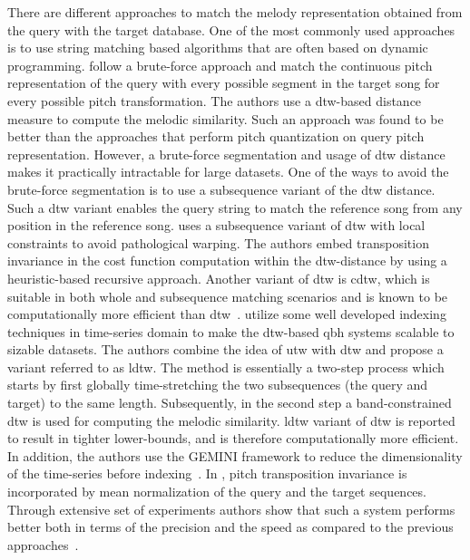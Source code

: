 There are different approaches to match the melody representation obtained from the query with the target database. One of the most commonly used approaches is to use string matching based algorithms that are often based on dynamic programming. \cite{mazzoni2001melody} follow a brute-force approach and match the continuous pitch representation of the query with every possible segment in the target song for every possible pitch transformation. The authors use a \gls{dtw}-based distance measure to compute the melodic similarity. Such an approach was found to be better than the approaches that perform pitch quantization on query pitch representation. However, a brute-force segmentation and usage of \gls{dtw} distance makes it practically intractable for large datasets. One of the ways to avoid the brute-force segmentation is to use a subsequence variant of the \gls{dtw} distance. Such a \gls{dtw} variant enables the query string to match the reference song from any position in the reference song. \cite{jang2000query} uses a subsequence variant of \gls{dtw} with local constraints to avoid pathological warping. The authors embed transposition invariance in the cost function computation within the \gls{dtw}-distance by using a heuristic-based recursive approach. Another variant of \gls{dtw} is \gls{cdtw}, which is suitable in both whole and subsequence matching scenarios and is known to be computationally more efficient than \gls{dtw}~\cite{lijffijt2010benchmarking}. \cite{zhu2003query} utilize some well developed indexing techniques in time-series domain to make the \gls{dtw}-based \gls{qbh} systems scalable to sizable datasets. The authors combine the idea of \gls{utw} with \gls{dtw} and propose a variant referred to as \gls{ldtw}. The method is essentially a two-step process which starts by first globally time-stretching the two subsequences (the query and target) to the same length. Subsequently, in the second step a band-constrained \gls{dtw} is used for computing the melodic similarity. \gls{ldtw} variant of \gls{dtw} is reported to result in tighter lower-bounds, and is therefore computationally more efficient. In addition, the authors use the GEMINI framework to reduce the dimensionality of the time-series before indexing~\cite{keogh2001dimensionality}. In \cite{zhu2003query}, pitch transposition invariance is incorporated by mean normalization of the query and the target sequences. Through extensive set of experiments authors show that such a system performs better both in terms of the precision and the speed as compared to the previous approaches~\citep{zhu2003query}. 


